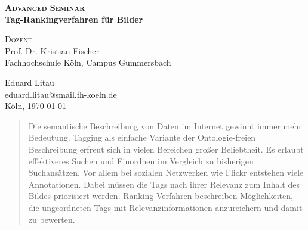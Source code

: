 %
%
%
%

\begin{titlepage}
\center
\vspace*{3em}
\large \textbf{\textsc{Advanced Seminar}}\\ 
\vspace{1em}
\huge\textbf{{\sffamily Tag-Rankingverfahren für Bilder}}
\vspace{3em}

\large
\textsc{Dozent}\\
 Prof. Dr. Kristian Fischer \\
\vspace{1em}
 Fachhochschule Köln, Campus Gummersbach\\
\vspace{9em}

\large Eduard Litau\\
\large eduard.litau@smail.fh-koeln.de\\
\vspace{14em}
Köln, \today
\end{titlepage}

\begin{abstract}
Die semantische Beschreibung von Daten im Internet gewinnt immer mehr Bedeutung. Tagging als einfache Variante der Ontologie-freien Beschreibung erfreut sich in vielen Bereichen großer Beliebtheit. Es erlaubt effektiveres Suchen und Einordnen im Vergleich zu bisherigen Suchansätzen. Vor allem bei sozialen Netzwerken wie Flickr entstehen viele Annotationen. Dabei müssen die Tags nach ihrer Relevanz zum Inhalt des Bildes priorisiert werden. Ranking Verfahren beschreiben Möglichkeiten, die ungeordneten Tags mit Relevanzinformationen anzureichern und damit zu bewerten. 
\end{abstract}